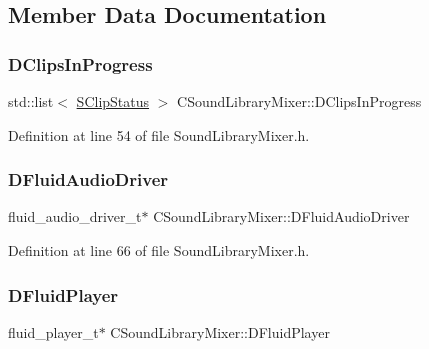 \subsection{Member Data Documentation}
\hypertarget{classCSoundLibraryMixer_aad014b54093b2aeee4d7014ab329dbf9}{}\label{classCSoundLibraryMixer_aad014b54093b2aeee4d7014ab329dbf9} 
\subsubsection{\texorpdfstring{D\+Clips\+In\+Progress}{DClipsInProgress}}
{\footnotesize\ttfamily std\+::list$<$ \hyperlink{structCSoundLibraryMixer_1_1SClipStatus}{S\+Clip\+Status} $>$ C\+Sound\+Library\+Mixer\+::\+D\+Clips\+In\+Progress\hspace{0.3cm}{\ttfamily [protected]}}



Definition at line 54 of file Sound\+Library\+Mixer.\+h.

\hypertarget{classCSoundLibraryMixer_a4ba4ccc9c6603c98a5432042e779977e}{}\label{classCSoundLibraryMixer_a4ba4ccc9c6603c98a5432042e779977e} 
\subsubsection{\texorpdfstring{D\+Fluid\+Audio\+Driver}{DFluidAudioDriver}}
{\footnotesize\ttfamily fluid\+\_\+audio\+\_\+driver\+\_\+t$\ast$ C\+Sound\+Library\+Mixer\+::\+D\+Fluid\+Audio\+Driver\hspace{0.3cm}{\ttfamily [protected]}}



Definition at line 66 of file Sound\+Library\+Mixer.\+h.

\hypertarget{classCSoundLibraryMixer_a6773ddf83ef86bc27598f6c5cee61d9c}{}\label{classCSoundLibraryMixer_a6773ddf83ef86bc27598f6c5cee61d9c} 
\subsubsection{\texorpdfstring{D\+Fluid\+Player}{DFluidPlayer}}
{\footnotesize\ttfamily fluid\+\_\+player\+\_\+t$\ast$ C\+Sound\+Library\+Mixer\+::\+D\+Fluid\+Player\hspace{0.3cm}{\ttfamily [protected]}}



